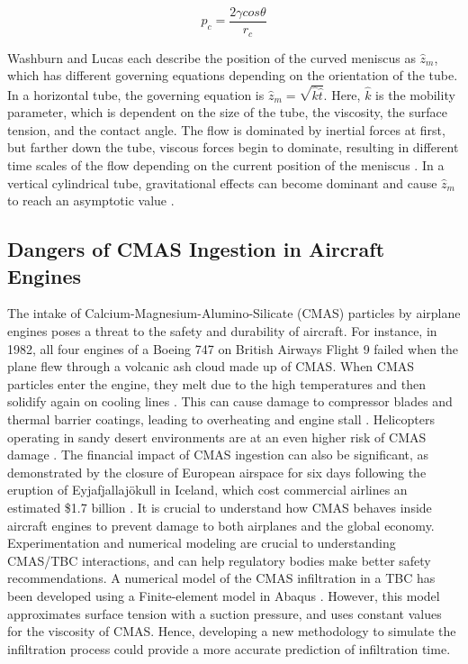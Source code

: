 \documentclass{UCF_ETD}
\begin{document}
\begin{equation}
    p_{c} = \frac{2\gamma cos\theta}{r_{c}}
    \label{eq:capillaryFlow}
\end{equation}

Washburn and Lucas each describe the position of the curved meniscus as $\hat{z}_{m}$, which has different governing equations depending on the orientation of the tube. In a horizontal tube, the governing equation is $\hat{z}_{m} = \sqrt{\hat{k}\hat{t}}$. Here, $\hat{k}$ is the mobility parameter, which is dependent on the size of the tube, the viscosity, the surface tension, and the contact angle. The flow is dominated by inertial forces at first, but farther down the tube, viscous forces begin to dominate, resulting in different time scales of the flow depending on the current position of the meniscus \cite{kolliopoulos2021capillary}. 
In a vertical cylindrical tube, gravitational effects can become dominant and cause $\hat{z}_{m}$ to reach an asymptotic value \cite{kolliopoulos2021capillary}.

\subsection{Dangers of CMAS Ingestion in Aircraft Engines}
\label{subsec:CMAS_Dangers}
The intake of Calcium-Magnesium-Alumino-Silicate (CMAS) particles by airplane engines poses a threat to the safety and durability of aircraft. For instance, in 1982, all four engines of a Boeing 747 on British Airways Flight 9 failed when the plane flew through a volcanic ash cloud made up of CMAS. When CMAS particles enter the engine, they melt due to the high temperatures and then solidify again on cooling lines \cite{Chen2015}. This can cause damage to compressor blades and thermal barrier coatings, leading to overheating and engine stall \cite{Chen2015}. Helicopters operating in sandy desert environments are at an even higher risk of CMAS damage \cite{Smialek}. The financial impact of CMAS ingestion can also be significant, as demonstrated by the closure of European airspace for six days following the eruption of Eyjafjallajökull in Iceland, which cost commercial airlines an estimated \$1.7 billion \cite{Thehumanconditionblog_2010}. It is crucial to understand how CMAS behaves inside aircraft engines to prevent damage to both airplanes and the global economy. Experimentation and numerical modeling are crucial to understanding CMAS/TBC interactions, and can help regulatory bodies make better safety recommendations. A numerical model of the CMAS infiltration in a TBC has been developed using a Finite-element model in Abaqus \cite{Kabir2019FlowKO}. However, this model approximates surface tension with a suction pressure, and uses constant values for the viscosity of CMAS. Hence, developing a new methodology to simulate the infiltration process could provide a more accurate prediction of infiltration time. 
\end{document}

